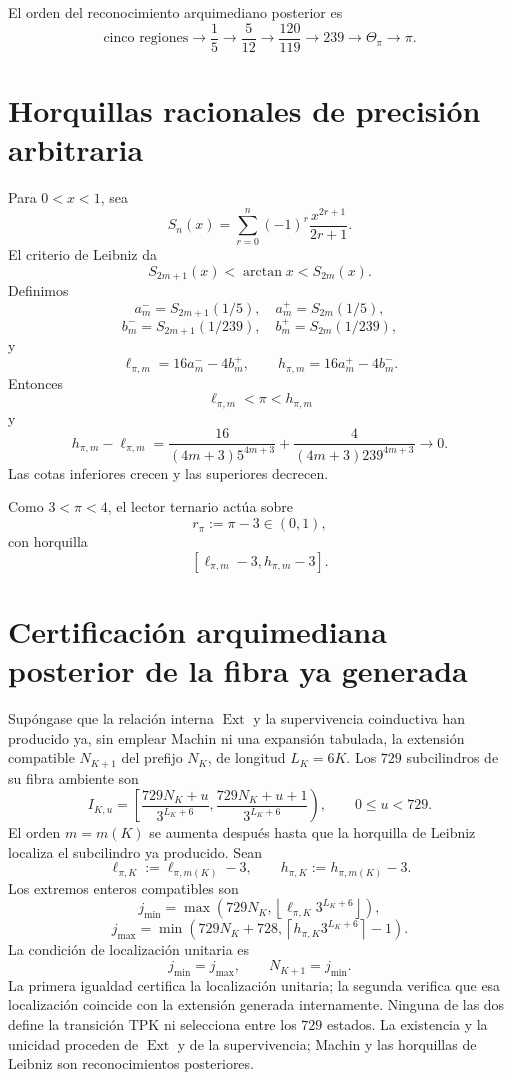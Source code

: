El orden del reconocimiento arquimediano posterior es
\[
 \text{cinco regiones}
 \to\frac15
 \to\frac5{12}
 \to\frac{120}{119}
 \to239
 \to\Theta_\pi
 \to\pi.
\]

\section{Horquillas racionales de precisión arbitraria}

Para \(0<x<1\), sea
\[
 S_n(x)=\sum_{r=0}^{n}(-1)^r\frac{x^{2r+1}}{2r+1}.
\]
El criterio de Leibniz da
\[
 S_{2m+1}(x)<\arctan x<S_{2m}(x).
\]
Definimos
\[
 a_m^-=S_{2m+1}(1/5),\quad a_m^+=S_{2m}(1/5),
\]
\[
 b_m^-=S_{2m+1}(1/239),\quad b_m^+=S_{2m}(1/239),
\]
y
\begin{equation}
 \ell_{\pi,m}=16a_m^- -4b_m^+,
 \qquad
 h_{\pi,m}=16a_m^+ -4b_m^-.
 \label{gfp:b:eq:horquilla-pi-autonoma}
\end{equation}
Entonces
\[
 \ell_{\pi,m}<\pi<h_{\pi,m}
\]
y
\begin{equation}
 h_{\pi,m}-\ell_{\pi,m}
 =
 \frac{16}{(4m+3)5^{4m+3}}
 +\frac{4}{(4m+3)239^{4m+3}}
 \longrightarrow0.
 \label{gfp:b:eq:anchura-horquilla-pi}
\end{equation}
Las cotas inferiores crecen y las superiores decrecen.

Como \(3<\pi<4\), el lector ternario actúa sobre
\[
 r_\pi:=\pi-3\in(0,1),
\]
con horquilla
\[
 [\ell_{\pi,m}-3,h_{\pi,m}-3].
\]

\section{Certificación arquimediana posterior de la fibra ya generada}

Supóngase que la relación interna \(\operatorname{Ext}\) y la supervivencia
coinductiva han producido ya, sin emplear Machin ni una expansión tabulada,
la extensión compatible \(N_{K+1}\) del prefijo \(N_K\), de longitud
\(L_K=6K\). Los \(729\) subcilindros de su fibra ambiente son
\[
 I_{K,u}=
 \left[
 \frac{729N_K+u}{3^{L_K+6}},
 \frac{729N_K+u+1}{3^{L_K+6}}
 \right),
 \qquad0\leq u<729.
\]
El orden \(m=m(K)\) se aumenta después hasta que la horquilla de Leibniz
localiza el subcilindro ya producido. Sean
\[
 \ell_{\pi,K}:=\ell_{\pi,m(K)}-3,
 \qquad
 h_{\pi,K}:=h_{\pi,m(K)}-3.
\]
Los extremos enteros compatibles son
\[
 j_{\min}=
 \max\!\left(
 729N_K,\left\lfloor
 \ell_{\pi,K}3^{L_K+6}\right\rfloor
 \right),
\]
\[
 j_{\max}=
 \min\!\left(
 729N_K+728,\left\lceil
 h_{\pi,K}3^{L_K+6}\right\rceil-1
 \right).
\]
La condición de localización unitaria es
\begin{equation}
 \boxed{j_{\min}=j_{\max},\qquad N_{K+1}=j_{\min}.}
 \label{gfp:b:eq:seleccion-unitaria-subcilindro-pi}
\end{equation}
La primera igualdad certifica la localización unitaria; la segunda verifica
que esa localización coincide con la extensión generada internamente. Ninguna
de las dos define la transición TPK ni selecciona entre los \(729\) estados.
La existencia y la unicidad proceden de \(\operatorname{Ext}\) y de la
supervivencia; Machin y las horquillas de Leibniz son reconocimientos
posteriores.

